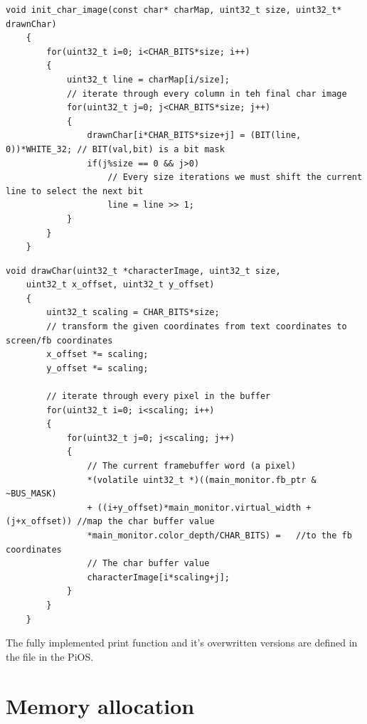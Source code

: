 \documentclass[12pt, svgnames]{book}
\begin{document}
\newpage
\begin{lstlisting}[style=c,title = Character expansion algorithm]
	void init_char_image(const char* charMap, uint32_t size, uint32_t* drawnChar)
	{
		for(uint32_t i=0; i<CHAR_BITS*size; i++)
		{
			uint32_t line = charMap[i/size];  
			// iterate through every column in teh final char image
			for(uint32_t j=0; j<CHAR_BITS*size; j++)
			{
				drawnChar[i*CHAR_BITS*size+j] = (BIT(line, 0))*WHITE_32; // BIT(val,bit) is a bit mask
				if(j%size == 0 && j>0)
					// Every size iterations we must shift the current line to select the next bit
					line = line >> 1;
			}
		}
	}
\end{lstlisting}

\begin{lstlisting}[style=C, title=Image Positioning algorithm]
	void drawChar(uint32_t *characterImage, uint32_t size, 
	uint32_t x_offset, uint32_t y_offset)
	{
		uint32_t scaling = CHAR_BITS*size;
		// transform the given coordinates from text coordinates to screen/fb coordinates
		x_offset *= scaling;
		y_offset *= scaling;
		
		// iterate through every pixel in the buffer
		for(uint32_t i=0; i<scaling; i++)
		{
			for(uint32_t j=0; j<scaling; j++)
			{
				// The current framebuffer word (a pixel)
				*(volatile uint32_t *)((main_monitor.fb_ptr & ~BUS_MASK) 
				+ ((i+y_offset)*main_monitor.virtual_width + (j+x_offset)) //map the char buffer value  
				*main_monitor.color_depth/CHAR_BITS) =   //to the fb coordinates
				// The char buffer value
				characterImage[i*scaling+j];
			}
		}
	}
\end{lstlisting}

The fully implemented print function and it's overwritten versions are defined in the \href{https://github.com/Makogan/PiOS/blob/master/source/Core/Libraries/string.c}{} file in the PiOS.

\section{Memory allocation}
\end{document}
